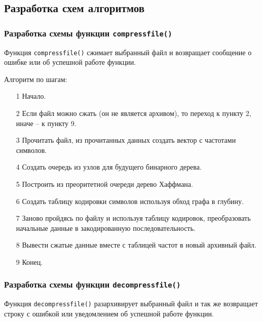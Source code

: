 \subsection{Разработка схем алгоритмов}


\subsubsection{Разработка схемы функции \texttt{compress{\textunderscore}file()}}

Функция \texttt{compress{\textunderscore}file()} сжимает выбранный файл и возвращает сообщение о ошибке или об успешной работе функции.



Алгоритм по шагам:
\begin{enumerate}
    \item[1] Начало.
    \item[2] Если файл можно сжать (он не является архивом), то переход к пункту 2, иначе -- к пункту 9.
    \item[3] Прочитать файл, из прочитанных данных создать вектор с частотами символов.
    \item[4] Создать очередь из узлов для будущего бинарного дерева.
    \item[5] Построить из преоритетной очереди дерево Хаффмана.
    \item[6] Создать таблицу кодировки символов используя обход графа в глубину.
    \item[7] Заново пройдясь по файлу и используя таблицу кодировок, преобразовать начальные данные в закодированную последовательность.
    \item[8] Вывести сжатые данные вместе с таблицей частот в новый архивный файл.
    \item[9] Конец.
\end{enumerate}



\subsubsection{Разработка схемы функции \texttt{decompress{\textunderscore}file()}}

Функция \texttt{decompress{\textunderscore}file()} разархивирует выбранный файл и так же возвращает строку с ошибкой или уведомлением об успешной работе функции.



